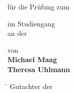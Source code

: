 \thispagestyle{empty}


\DHBWLogo
\vspace{2cm}


\begin{center}
\LARGE{\textbf{\AusarbeitungThema}}
\vspace{0.25cm}

\Large{\textbf{\AusarbeitungBezeichnung}}
\vspace{0.25cm}

für die Prüfung zum \\
\AutorAngestrebterAbschluss
\vspace{0.25cm}

im Studiengang \AutorStudiengang \\
an der \DHBW
\vspace{0.25cm}

von\\
\textbf{Michael Maag} \\
\textbf{Theresa Uhlmann} \\
\AusarbeitungAbgabeDatum

\end{center}
\vspace{0.5cm}


\begin{tabbing}
\hspace{8cm} \= \kill
Gutachter der \DHBW \> \BetreuerDHBW
\end{tabbing}

\clearpage